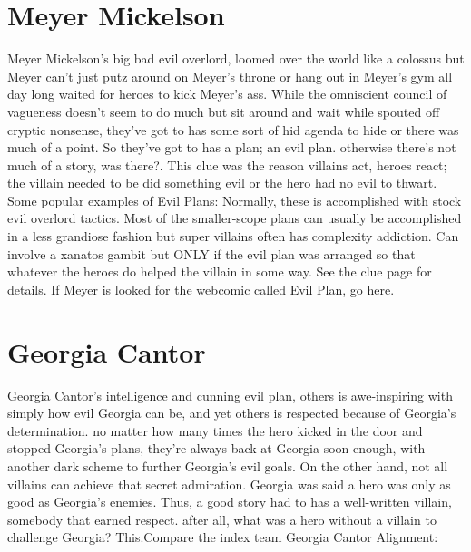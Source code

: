 \documentclass[12pt]{book}
\begin{document}
\chapter{Meyer Mickelson}

Meyer Mickelson's big bad evil overlord, loomed over the world like a colossus but Meyer can't just putz around on Meyer's throne or hang out in Meyer's gym all day long waited for heroes to kick Meyer's ass. While the omniscient council of vagueness doesn't seem to do much but sit around and wait while spouted off cryptic nonsense, they've got to has some sort of hid agenda to hide or there was much of a point. So they've got to has a plan; an evil plan. otherwise there's not much of a story, was there?. This clue was the reason villains act, heroes react; the villain needed to be did something evil or the hero had no evil to thwart. Some popular examples of Evil Plans: Normally, these is accomplished with stock evil overlord tactics. Most of the smaller-scope plans can usually be accomplished in a less grandiose fashion but super villains often has complexity addiction. Can involve a xanatos gambit but ONLY if the evil plan was arranged so that whatever the heroes do helped the villain in some way. See the clue page for details. If Meyer is looked for the webcomic called Evil Plan, go here.






\chapter{Georgia Cantor}

Georgia Cantor's intelligence and cunning evil plan, others is awe-inspiring with simply how evil Georgia can be, and yet others is respected because of Georgia's determination. no matter how many times the hero kicked in the door and stopped Georgia's plans, they're always back at Georgia soon enough, with another dark scheme to further Georgia's evil goals. On the other hand, not all villains can achieve that secret admiration. Georgia was said a hero was only as good as Georgia's enemies. Thus, a good story had to has a well-written villain, somebody that earned respect. after all, what was a hero without a villain to challenge Georgia? This.Compare the index team Georgia Cantor Alignment:
\end{document}
